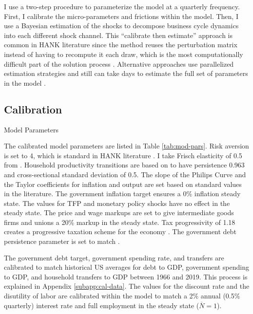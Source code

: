 I use a two-step procedure to parameterize the model at a quarterly frequency. First, I calibrate the micro-parameters and frictions within the model. Then, I use a Bayesian estimation of the shocks to decompose business cycle dynamics into each different shock channel. This ``calibrate then estimate'' approach is common in HANK literature since the method reuses the perturbation matrix instead of having to recompute it each draw, which is the most computationally difficult part of the solution process \autocites{winberry2018method}{auclert2020micro}{auclert2021using}{bayer2024shocks}. Alternative approaches use parallelized estimation strategies and still can take days to estimate the full set of parameters in the model \autocite{acharya2023estimating}.


\subsection{Calibration}

\begin{table}[t!]
    \centering
    \caption{Model Parameters}
    
    \label{tab:mod-pars}
\end{table}

The calibrated model parameters are listed in Table \ref{tab:mod-pars}. Risk aversion is set to 4, which is standard in HANK literature \autocite{kaplan2018monetary}. I take Frisch elasticity of 0.5 from \autocite{chetty2012bounds}. Household productivity transitions are based on \textcite{storesletten2004cyclical} to have persistence 0.963 and cross-sectional standard deviation of 0.5. The slope of the Philips Curve and the Taylor coefficients for inflation and output are set based on standard values in the literature. The government inflation target ensures a 0\% inflation steady state. The values for TFP and monetary policy shocks have no effect in the steady state. The price and wage markups are set to give intermediate goods firms and unions a 20\% markup in the steady state. Tax progressivity of 1.18 creates a progressive taxation scheme for the economy \autocite{heathcote2017optimal}. The government debt persistence parameter is set to match \textcite{auclert2024intertemporal}.

The government debt target, government spending rate, and transfers are calibrated to match historical US averages for debt to GDP, government spending to GDP, and household transfers to GDP between 1966 and 2019. This process is explained in Appendix \ref{subapp:cal-data}. The values for the discount rate and the disutility of labor are calibrated within the model to match a 2\% annual (0.5\% quarterly) interest rate and full employment in the steady state ($\overline{N} = 1$).


